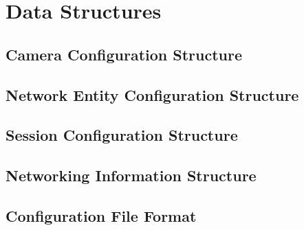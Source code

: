 
\chapter{Data Structures}
\label{structs}

\section{Camera Configuration Structure}


\section{Network Entity Configuration Structure}


\section{Session Configuration Structure}


\section{Networking Information Structure}


\section{Configuration File Format}


%

